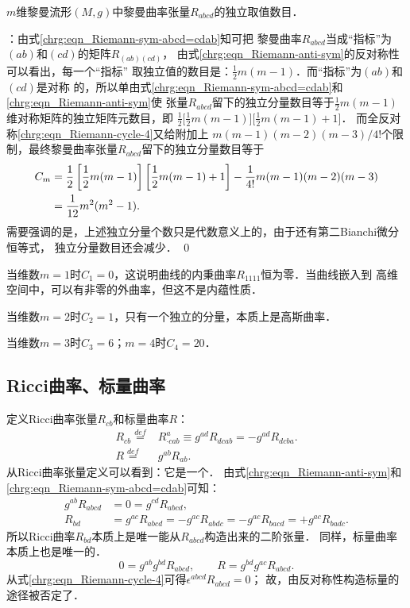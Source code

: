 \begin{example}
    $m$维黎曼流形$(M,g)$中黎曼曲率张量$R_{abcd}$的独立取值数目．
\end{example}
：由式\eqref{chrg:eqn_Riemann-sym-abcd=cdab}知可把
黎曼曲率$R_{abcd}$当成“指标”为$(ab)$和$(cd)$的矩阵$R_{(ab)(cd)}$，
由式\eqref{chrg:eqn_Riemann-anti-sym}的反对称性可以看出，每一个“指标”
取独立值的数目是：$\frac{1}{2}m(m-1)$．而“指标”为$(ab)$和$(cd)$是对称
的，所以单由式\eqref{chrg:eqn_Riemann-sym-abcd=cdab}和\eqref{chrg:eqn_Riemann-anti-sym}使
张量$R_{abcd}$留下的独立分量数目等于$\frac{1}{2}m(m-1)$维对称矩阵的独立矩阵元数目，即
$\frac{1}{2}\bigl[\frac{1}{2}m(m-1)\bigr] \bigl[\frac{1}{2}m(m-1)+1\bigr]$．
而全反对称\eqref{chrg:eqn_Riemann-cycle-4}又给附加上
$m(m-1)(m-2)(m-3)/4!$个限制，最终黎曼曲率张量$R_{abcd}$留下的独立分量数目等于
\begin{align}
    C_m &= \frac{1}{2}\left[\frac{1}{2}m(m-1)\right] \left[\frac{1}{2}m(m-1)+1\right]
             - \frac{1}{4!}m(m-1)(m-2)(m-3)  \notag\\
      &= \frac{1}{12} m^2(m^2-1) . \label{chrg:eqn_Number-Of-Riemannd4}
\end{align}
需要强调的是，上述独立分量个数只是代数意义上的，由于还有第二Bianchi微分恒等式，
独立分量数目还会减少． \qed

当维数$m=1$时$C_1=0$，这说明曲线的内秉曲率$R_{1111}$恒为零．当曲线嵌入到
高维空间中，可以有非零的外曲率，但这不是内蕴性质． %

当维数$m=2$时$C_2=1$，只有一个独立的分量，本质上是高斯曲率． %

当维数$m=3$时$C_3=6$；$m=4$时$C_4=20$．


\subsection{Ricci曲率、标量曲率}
定义Ricci曲率张量$R_{cb}$和标量曲率$R$：
\begin{align}
    R_{cb} \overset{def}{=}& R_{\cdot cab}^a \equiv g^{ad}R_{dcab}=-g^{ad}R_{dcba} . \label{chrg:eqn_RicciCurvatured2}\\
    R \overset{def}{=}& g^{ab} R_{ab}. \label{chrg:eqn_ScalarCurvature}
\end{align}
从Ricci曲率张量定义可以看到：它是一个．
由式\eqref{chrg:eqn_Riemann-anti-sym}和\eqref{chrg:eqn_Riemann-sym-abcd=cdab}可知：
\begin{align*}
    g^{ab}R_{abcd} &=0= g^{cd}R_{abcd}, \\
    R_{bd} & = g^{ac}R_{abcd} = -g^{ac}R_{abdc} = -g^{ac}R_{bacd} = + g^{ac}R_{badc} .
\end{align*}
所以Ricci曲率$R_{bd}$本质上是唯一能从$R_{abcd}$构造出来的二阶张量．
同样，标量曲率本质上也是唯一的．
\begin{equation*}
    0 = g^{ab} g^{bd}R_{abcd}, \qquad     R  = g^{bd} g^{ac}R_{abcd} .
\end{equation*}
从式\eqref{chrg:eqn_Riemann-cycle-4}可得$\epsilon^{abcd}R_{abcd} =0$；
故，由反对称性构造标量的途径被否定了．




